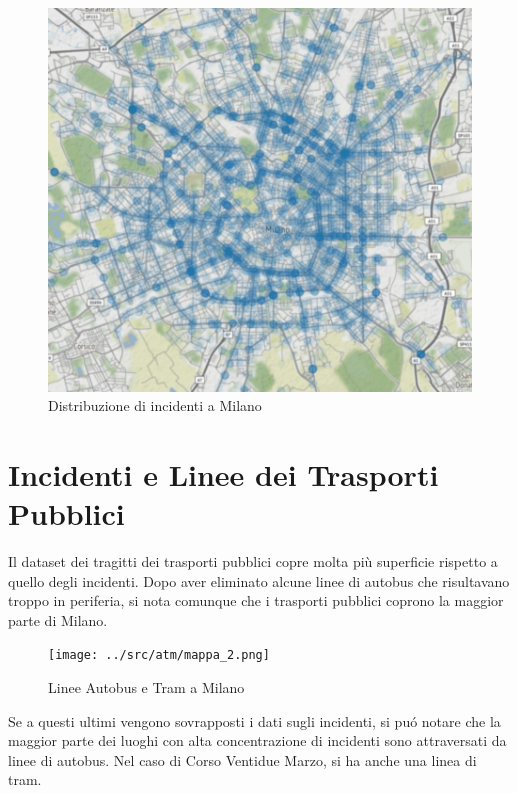 \documentclass[a4paper]{report}
\begin{document}
\begin{figure}
    \includegraphics[width=\linewidth]{../src/incidenti/geo_incidenti.png}
    \caption{Distribuzione di incidenti a Milano}
    \label{fig:geo_incidenti}
\end{figure}




\section{Incidenti e Linee dei Trasporti Pubblici}

Il dataset dei tragitti dei trasporti pubblici copre molta più superficie rispetto a 
quello degli incidenti.
Dopo aver eliminato alcune linee di autobus che risultavano troppo in periferia, 
si nota comunque che i trasporti pubblici coprono la maggior parte di Milano.

\begin{figure}
    \texttt{[image: ../src/atm/mappa\_2.png]}
    \caption{Linee Autobus e Tram a Milano}
    \label{fig:geo_trasporti}
\end{figure}


Se a questi ultimi vengono sovrapposti i dati sugli incidenti, 
si pu\'o notare che la maggior parte dei luoghi con alta concentrazione di incidenti sono 
attraversati da linee di autobus. Nel caso di Corso Ventidue Marzo, si ha anche una linea di tram.
\end{document}

